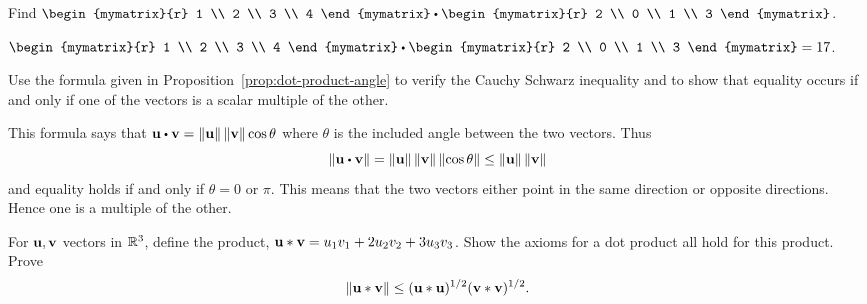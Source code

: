 
\begin{ex} Find $\begin{mymatrix}{r}
1 \\
2 \\
3 \\
4
\end{mymatrix} \dotprod \begin{mymatrix}{r}
2 \\
0 \\
1 \\
3
\end{mymatrix}$.
\begin{sol}
$\begin{mymatrix}{r}
1 \\
2 \\
3 \\
4
\end{mymatrix} \dotprod \begin{mymatrix}{r}
2 \\
0 \\
1 \\
3
\end{mymatrix} = 17$.
\end{sol}
\end{ex}

\begin{ex} Use the formula given in Proposition~\ref{prop:dot-product-angle} to verify the Cauchy Schwarz inequality and
to show that equality occurs if and only if one of the vectors is a scalar
multiple of the other.
\begin{sol}
This formula says that $\vect{u}\dotprod \vect{v}=\norm{
\vect{u}} \norm{\vect{v}} \cos \theta $ where $
\theta $ is the included angle between the two vectors. Thus
\begin{equation*}
\norm{\vect{u}\dotprod \vect{v}} =\norm{\vect{u}}
\norm{\vect{v}} \norm{\cos \theta} \leq
\norm{\vect{u}} \norm{\vect{v}}
\end{equation*}
and equality holds if and only if $\theta =0$ or $\pi$. This means that the
two vectors either point in the same direction or opposite directions. Hence
one is a multiple of the other.
\end{sol}
\end{ex}

\begin{ex} For $\mbox{\bf u},\mbox{\bf v}$ vectors in $\mathbb{R}^{3}$, define the product,
$\mbox{\bf u}\ast \mbox{\bf v} =  u_{1}v_{1}+2u_{2}v_{2}+3u_{3}v_{3}$. Show the axioms
for a dot product all hold for this product. Prove
\begin{equation*}
\left\|\mbox{\bf u}\ast \mbox{\bf v}\right\| \leq (\mbox{\bf u}\ast \mbox{\bf u})
^{1/2}(\mbox{\bf v}\ast \mbox{\bf v}) ^{1/2}.
\end{equation*}
\end{ex}

